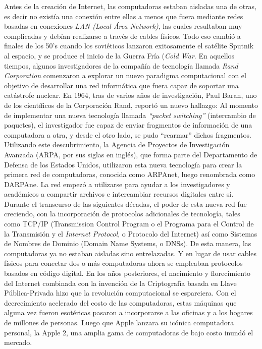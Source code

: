 \documentclass[12pt]{report} %
\begin{document}
Antes de la creación de Internet, las computadoras estaban aisladas una de otras, es decir no existía una conexión entre ellas a menos que fuera mediante redes basadas en conexiones \textit{LAN (Local Área Network)}, las cuales resultaban muy complicadas y debían realizarse a través de cables físicos. Todo eso cambió a finales de los 50’s cuando los soviéticos lanzaron exitosamente el satélite Sputnik al espacio, y se produce el inicio de la Guerra Fría (\textit{Cold War}. En aquellos tiempos, algunos investigadores de la compañía de tecnología llamada \textit{Rand Corporation} comenzaron a explorar un nuevo paradigma computacional con el objetivo de desarrollar una red informática que fuera capaz de soportar una catástrofe nuclear. En 1964, tras de varios años de investigación, Paul Baran, uno de los científicos de la Corporación Rand, reportó un nuevo hallazgo: Al momento de implementar una nueva tecnología llamada \textit{“packet switching”} (intercambio de paquetes), el investigador fue capaz de enviar fragmentos de información de una computadora a otra, y desde el otro lado, se pudo “rearmar” dichos fragmentos. Utilizando este descubrimiento, la Agencia de Proyectos de Investigación Avanzada (ARPA, por sus siglas en inglés), que forma parte del Departamento de Defensa de los Estados Unidos, utilizaron esta nueva tecnología para crear la primera red de computadoras, conocida como ARPAnet, luego renombrada como DARPAne. La red empezó a utilizarse para ayudar a los investigadores y académicos a compartir archivos e intercambiar recursos digitales entre sí. Durante el transcurso de las siguientes décadas, el poder de esta nueva red fue creciendo, con la incorporación de protocolos adicionales de tecnología, tales como TCP/IP (Transmission Control Program o el Programa para el Control de la Transmisión y el \textit{Internet Protocol}, o Protocolo del Internet) así como Sistemas de Nombres de Dominio (Domain Name Systems, o DNSs). De esta manera, las computadoras ya no estaban aisladas sino entrelazadas. Y en lugar de usar cables físicos para conectar dos o más computadoras ahora se empleaban protocolos basados en código digital.
En los años posteriores, el nacimiento y florecimiento del Internet combinada con la invención de la Criptografía basada en Llave Pública-Privada hizo que la revolución computacional se esparciera. Con el decrecimiento acelerado del costo de las computadoras, estas máquinas que alguna vez fueron esotéricas pasaron a incorporarse a las oficinas y a los hogares de millones de personas. Luego que Apple lanzara su icónica computadora personal, la Apple 2, una amplia gama de computadoras de bajo costo inundó el mercado.
\end{document}
